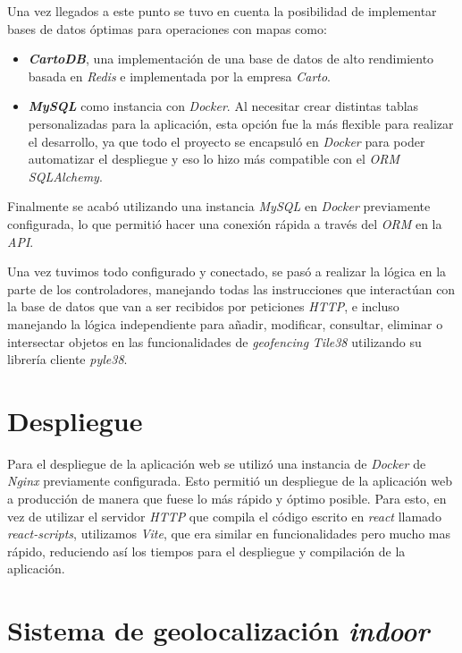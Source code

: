 Una vez llegados a este punto se tuvo en cuenta la posibilidad de implementar bases de datos óptimas para operaciones con mapas como:
\begin{itemize}
    \item \textit{\textbf{CartoDB}}, una implementación de una base de datos de alto rendimiento basada en \textit{Redis} e implementada por la empresa \textit{Carto}.
    \item \textit{\textbf{MySQL}} como instancia con \textit{Docker}. Al necesitar crear distintas tablas personalizadas para la aplicación, esta opción fue la más flexible para realizar el desarrollo, ya que todo el proyecto se encapsuló en \textit{Docker} para poder automatizar el despliegue y eso lo hizo más compatible con el \textit{ORM SQLAlchemy}.
\end{itemize}

Finalmente se acabó utilizando una instancia \textit{MySQL} en \textit{Docker}  previamente configurada, lo que permitió hacer una conexión rápida a través del \textit{ORM} en la \textit{API}.

Una vez tuvimos todo configurado y conectado, se pasó a realizar la lógica en la parte de los controladores, manejando todas las instrucciones que interactúan con la base de datos que van a ser recibidos por peticiones \textit{HTTP}, e incluso manejando la lógica independiente para añadir, modificar, consultar, eliminar o intersectar objetos en las funcionalidades de \textit{geofencing} \textit{Tile38} utilizando su librería cliente \textit{pyle38}.

\section{Despliegue}
Para el despliegue de la aplicación  web se utilizó una instancia de \textit{Docker} de \textit{Nginx} previamente configurada. Esto permitió un despliegue de la aplicación web a producción de manera que fuese lo más rápido y óptimo posible. Para esto, en vez de utilizar el servidor \textit{HTTP} que compila el código escrito en \textit{react} llamado \textit{react-scripts}, utilizamos \textit{Vite}, que era similar en funcionalidades pero mucho mas rápido, reduciendo así los tiempos para el despliegue y compilación de la aplicación.


\section{Sistema de geolocalización \textit{indoor}}


